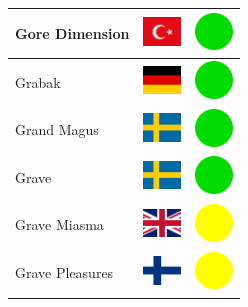 \documentclass[12pt, a4paper, twoside]{report}
\begin{document}
\begin{center}
\begin{longtable}{|p{5cm}|p{2cm}|p{2cm}|}
Gore Dimension & \includegraphics[width=1cm]{4x3/tr} & \includegraphics[width=1cm]{likes/y} \\ \hline
Grabak & \includegraphics[width=1cm]{4x3/de} & \includegraphics[width=1cm]{likes/y} \\ \hline
Grand Magus & \includegraphics[width=1cm]{4x3/se} & \includegraphics[width=1cm]{likes/y} \\ \hline
Grave & \includegraphics[width=1cm]{4x3/se} & \includegraphics[width=1cm]{likes/y} \\ \hline
Grave Miasma & \includegraphics[width=1cm]{4x3/gb} & \includegraphics[width=1cm]{likes/m} \\ \hline
Grave Pleasures & \includegraphics[width=1cm]{4x3/fi} & \includegraphics[width=1cm]{likes/m} \\ \hline

\end{longtable}
\end{center}
\end{document}
